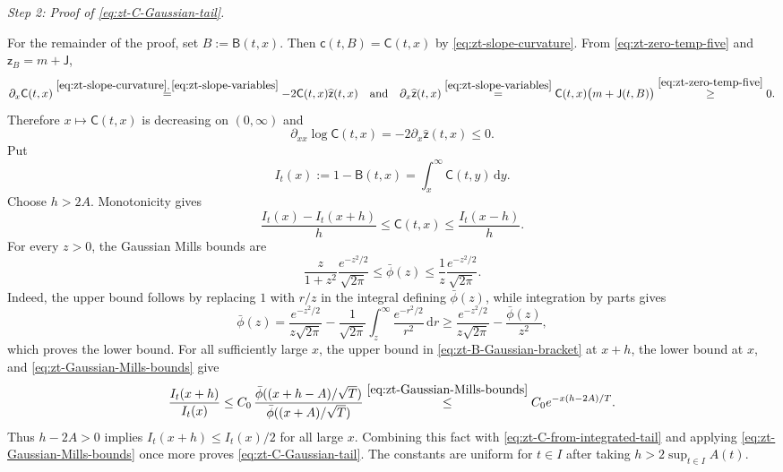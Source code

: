 \documentclass[10pt]{amsart}
\theoremstyle{definition}
\theoremstyle{remark}
\numberwithin{equation}{section}
\newcommand{\1}{\mathbf 1}
\newcommand{\dd}{\,\mathrm d}
\newcommand{\stackref}[2]{\stackrel{#2}{#1}}
\begin{document}
\smallskip
\noindent\emph{Step 2: Proof of \eqref{eq:zt-C-Gaussian-tail}.}

For the remainder of the proof, set $B:=\mathsf B(t,x)$. Then $\mathsf c(t,B)=\mathsf C(t,x)$ by \eqref{eq:zt-slope-curvature}. From \eqref{eq:zt-zero-temp-five} and $\mathsf z_B=m+\mathsf J$,
\begin{equation}
 \partial_x\mathsf C(t,x)
 \stackref{=}{\eqref{eq:zt-slope-curvature},\,\eqref{eq:zt-slope-variables}}
 -2\mathsf C(t,x)\widehat{\mathsf z}(t,x)
 \quad\text{and}\quad
 \partial_x\widehat{\mathsf z}(t,x)
 \stackref{=}{\eqref{eq:zt-slope-variables}}
 \mathsf C(t,x)\bigl(m+\mathsf J(t,B)\bigr)
 \stackref{\geq}{\eqref{eq:zt-zero-temp-five}}0.
 \label{eq:zt-Cz-x-relations}
\end{equation}
Therefore $x\mapsto\mathsf C(t,x)$ is decreasing on $(0,\infty)$ and
\begin{equation*}
 \partial_{xx}\log\mathsf C(t,x)=-2\partial_x\widehat{\mathsf z}(t,x)\leq0.
\end{equation*}
Put
\begin{equation*}
 I_t(x):=1-\mathsf B(t,x)=\int_x^\infty\mathsf C(t,y)\dd y.
\end{equation*}
Choose $h>2A$.  Monotonicity gives
\begin{equation}
 \frac{I_t(x)-I_t(x+h)}h\leq\mathsf C(t,x)
 \leq\frac{I_t(x-h)}h.
 \label{eq:zt-C-from-integrated-tail}
\end{equation}
For every $z>0$, the Gaussian Mills bounds are
\begin{equation}
 \frac{z}{1+z^2}\frac{e^{-z^2/2}}{\sqrt{2\pi}}
 \leq\bar\phi(z)
 \leq\frac1z\frac{e^{-z^2/2}}{\sqrt{2\pi}}.
 \label{eq:zt-Gaussian-Mills-bounds}
\end{equation}
Indeed, the upper bound follows by replacing $1$ with $r/z$ in the integral defining $\bar\phi(z)$, while integration by parts gives
\begin{equation*}
 \bar\phi(z)=\frac{e^{-z^2/2}}{z\sqrt{2\pi}}
 -\frac1{\sqrt{2\pi}}\int_z^\infty\frac{e^{-r^2/2}}{r^2}\dd r
 \geq\frac{e^{-z^2/2}}{z\sqrt{2\pi}}-\frac{\bar\phi(z)}{z^2},
\end{equation*}
which proves the lower bound. For all sufficiently large $x$, the upper bound in \eqref{eq:zt-B-Gaussian-bracket} at $x+h$, the lower bound at $x$, and \eqref{eq:zt-Gaussian-Mills-bounds} give
\begin{equation*}
 \frac{I_t(x+h)}{I_t(x)}
 \leq C_0\,
 \frac{\bar\phi((x+h-A)/\sqrt T)}
      {\bar\phi((x+A)/\sqrt T)}
 \stackref{\leq}{\eqref{eq:zt-Gaussian-Mills-bounds}}
 C_0e^{-x(h-2A)/T}.
\end{equation*}
Thus $h-2A>0$ implies $I_t(x+h)\leq I_t(x)/2$ for all large $x$. Combining this fact with \eqref{eq:zt-C-from-integrated-tail} and applying \eqref{eq:zt-Gaussian-Mills-bounds} once more proves \eqref{eq:zt-C-Gaussian-tail}. The constants are uniform for $t\in I$ after taking $h>2\sup_{t\in I}A(t)$.
\end{document}
